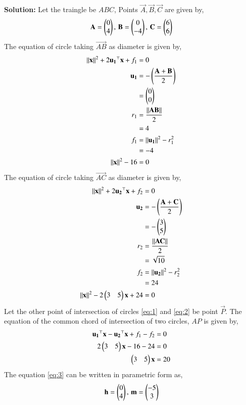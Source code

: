 \documentclass[journal,12pt,twocolumn]{IEEEtran}
\begin{document}
\begin{enumerate}
\textbf{Solution:}
Let the traingle be $ABC$, Points $\vec{A},\vec{B},\vec{C}$ are given by,
\begin{align}
\mathbf{A} = \begin{pmatrix}0\\4\end{pmatrix}, \,\mathbf{B} = \begin{pmatrix}0\\-4\end{pmatrix}, \,\mathbf{C} = \begin{pmatrix}6\\6\end{pmatrix}
\end{align}
The equation of circle taking $\vec{AB}$ as diameter is given by,
\begin{align}
\left\lVert\mathbf{x}\right\rVert^2 + 2\mathbf{u_1}^\top\mathbf{x} + f_1 &= 0 \\
\mathbf{u_1} &= -\left(\frac{\mathbf{A}+\mathbf{B}}{2}\right)\\
&= \begin{pmatrix}0\\0\end{pmatrix}\\
r_1 &= \frac{\left\lVert\mathbf{AB}\right\rVert}{2}\\
&= 4\\
f_1 &= \left\lVert\mathbf{u_1}\right\rVert^2 - r_1^2\\
&= -4\\
\left\lVert\mathbf{x}\right\rVert^2 -16 &= 0
\label{eq:1}
\end{align}
The equation of circle taking $\vec{AC}$ as diameter is given by,
\begin{align}
\left\lVert\mathbf{x}\right\rVert^2 + 2\mathbf{u_2}^\top\mathbf{x} + f_2 &= 0 \\
\mathbf{u_2} &= -\left(\frac{\mathbf{A}+\mathbf{C}}{2}\right)\\
&= -\begin{pmatrix}3\\5\end{pmatrix}\\
r_2 &= \frac{\left\lVert\mathbf{AC}\right\rVert}{2}\\
&= \sqrt{10}\\
f_2 &= \left\lVert\mathbf{u_2}\right\rVert^2 - r_2^2\\
&= 24\\
\left\lVert\mathbf{x}\right\rVert^2 -2\begin{pmatrix}3&5\end{pmatrix}\mathbf{x}+24 &= 0
\label{eq:2}
\end{align}
Let the other point of intersection of circles \eqref{eq:1} and \eqref{eq:2} be point $\vec{P}$. The equation of the common chord of intersection of two circles, $AP$ is given by,
\begin{align}
\mathbf{u_1}^\top\mathbf{x}-\mathbf{u_2}^\top\mathbf{x}+f_1 - f_2 &= 0\\
2\begin{pmatrix}3 & 5\end{pmatrix}\mathbf{x}-16-24&= 0\\
\begin{pmatrix}3&5\end{pmatrix}\mathbf{x} &= 20
\label{eq:3}
\end{align}
The equation \eqref{eq:3} can be written in parametric form as,
\begin{align}
\vec{h} = \myvec{0\\4}, \, \vec{m} = \myvec{-5\\3}\\

\end{align}
\end{enumerate}
\end{document}
